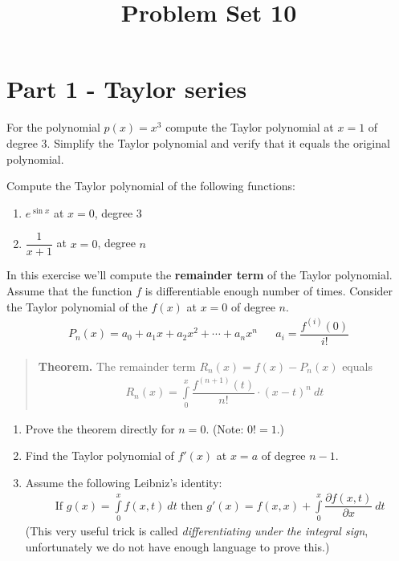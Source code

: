 \documentclass[9pt, a4paper, oneside, reqno]{amsart}
\title{Problem Set 10}
\begin{document}
\maketitle
\thispagestyle{fancy}


\section*{Part 1 - Taylor series}
\begin{questions}
	\item For the polynomial $ p(x) = x^3$ compute the Taylor polynomial at $x=1$ of degree 3. Simplify the Taylor polynomial and verify that it equals the original polynomial.

	\item Compute the Taylor polynomial of the following functions:
	\begin{multicols}{2}
		\begin{enumerate}
			\item $ e^{\sin x}$ at $ x=0$, degree 3
			\item $ \dfrac{1}{x+1}$ at $ x=0$, degree $ n$
		\end{enumerate}
	\end{multicols}


	\item In this exercise we'll compute the \textbf{remainder term} of the Taylor polynomial. Assume that the function $ f$ is differentiable enough number of times. Consider the Taylor polynomial of the $ f(x)$ at $ x=0$ of degree $ n$.
	\begin{align*}
		P_{n}(x) = a_0 + a_1 x + a_2 x^2 + \cdots + a_n x^n &   & a_i = \dfrac{f^{(i)}(0)}{i!}
	\end{align*}
	\begin{quote}
		\textbf{Theorem.} The remainder term $ R_{n}(x) = f(x) - P_{n}(x)$ equals
		\begin{align*}
			R_{n}(x)  = \int \limits_0^x \dfrac{f^{(n+1)}(t)}{n!} \cdot (x-t)^n \: dt
		\end{align*}
	\end{quote}
	\begin{enumerate}
		\item Prove the theorem directly for $ n = 0$. (Note: $ 0! = 1$.)
		\item Find the Taylor polynomial of $ f'(x)$ at $ x=a$ of degree $ n-1$.
		\item Assume the following Leibniz's identity:
		      \begin{align*}
		      	\mbox{ If } g(x) = \int \limits_0^x f(x,t) \: dt \mbox{ then } g'(x) = f(x,x) + \int \limits_0^x \dfrac{\partial f(x,t)}{\partial x} \: dt
		      \end{align*}
		      (This very useful trick is called \emph{differentiating under the integral sign}, unfortunately we do not have enough language to prove this.)


\end{enumerate}
\end{questions}
\end{document}
